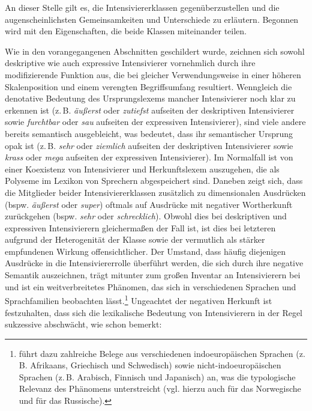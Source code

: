  \par  \label{GemUn}
An dieser Stelle gilt es, die Intensiviererklassen gegenüberzustellen und die augenscheinlichsten Gemeinsamkeiten und Unterschiede zu erläutern. Begonnen wird mit den Eigenschaften, die beide Klassen miteinander teilen. 


Wie in den vorangegangenen Abschnitten geschildert wurde, zeichnen sich sowohl deskriptive wie auch expressive Intensivierer vornehmlich durch ihre modifizierende Funktion aus, die bei gleicher Verwendungsweise in einer höheren Skalenposition und einem verengten Begriffsumfang resultiert. Wenngleich die denotative Bedeutung des Ursprungslexems mancher Intensivierer noch klar zu erkennen ist (z.\,B. \textit{äußerst} oder \textit{zutiefst} aufseiten der deskriptiven Intensivierer sowie \textit{furchtbar} oder \textit{sau} aufseiten der expressiven Intensivierer), sind viele andere bereits semantisch ausgebleicht, was bedeutet, dass ihr semantischer Ursprung opak ist (z.\,B. \textit{sehr} oder \textit{ziemlich} aufseiten der deskriptiven Intensivierer sowie \textit{krass} oder \textit{mega} aufseiten der expressiven Intensivierer). Im Normalfall ist von einer Koexistenz von Intensivierer und Herkunftslexem auszugehen, die als Polyseme im Lexikon von Sprechern abgespeichert sind. Daneben zeigt sich, dass die Mitglieder beider Intensiviererklassen zusätzlich zu dimensionalen Ausdrücken (bspw. \textit{äußerst} oder \textit{super}) oftmals auf Ausdrücke mit negativer Wortherkunft zurückgehen (bspw. \textit{sehr} oder \textit{schrecklich}). Obwohl dies bei deskriptiven und expressiven Intensivierern gleichermaßen der Fall ist, ist dies bei letzteren aufgrund der Heterogenität der Klasse sowie der vermutlich als stärker empfundenen Wirkung offensichtlicher. Der Umstand, dass häufig diejenigen Ausdrücke in die Intensiviererrolle überführt werden, die sich durch ihre negative Semantik auszeichnen, trägt mitunter zum großen Inventar an Intensivierern bei und ist ein weitverbreitetes Phänomen, das sich in verschiedenen Sprachen und Sprachfamilien beobachten lässt.\footnote{\citet[125ff.]{Hentschel.1998b} führt dazu zahlreiche Belege aus verschiedenen indoeuropäischen Sprachen (z.\,B. Afrikaans, Griechisch und Schwedisch) sowie nicht-indoeuropäischen Sprachen (z.\,B. Arabisch, Finnisch und Japanisch) an, was die typologische Relevanz des Phänomens unterstreicht (vgl. hierzu auch \citealt[]{Skommer.1992} für das Norwegische und {\citealt[]{Laitenberger.2016}} für das Russische).} Ungeachtet der negativen Herkunft ist festzuhalten, dass sich die lexikalische Bedeutung von Intensivierern in der Regel sukzessive abschwächt, wie schon {\citet[]{Tobler.1868}} bemerkt:

